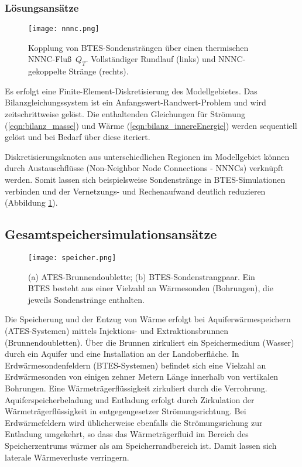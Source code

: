 \documentclass[12pt, a4paper, twoside, titlepage]{article}
\begin{document}
%

\subsubsection{L\" osungsans\" atze}
%

%
\begin{figure} [b!]
\centering
\texttt{[image: nnnc.png]}
\caption{Kopplung von BTES-Sondenstr\" angen \" uber einen thermischen NNNC-Flu\ss \ $Q_T$. Vollst\" andiger Rundlauf (links) und NNNC-gekoppelte Str\" ange (rechts).}
\label{fig:nnnc}
\end{figure}
%

%
\noindent
Es erfolgt eine Finite-Element-Diskretisierung des Modellgebietes. 
%
Das Bilanzgleichungssystem ist ein Anfangswert-Randwert-Problem und wird zeitschrittweise gel\" ost.
%
Die enthaltenden Gleichungen f\" ur Str\" omung (\ref{eqn:bilanz_masse}) und W\" arme (\ref{eqn:bilanz_innereEnergie}) werden sequentiell gel\" ost und bei Bedarf \" uber diese iteriert.

%
Diskretisierungsknoten aus unterschiedlichen Regionen im Modellgebiet k\" onnen durch Austauschfl\" usse (Non-Neighbor Node Connections - NNNCs) verkn\" upft werden.
%
Somit lassen sich beispielsweise Sondenstr\" ange in BTES-Simulationen verbinden
und der Vernetzungs- und Rechenaufwand deutlich reduzieren (Abbildung \ref{fig:nnnc}).
%
%


\subsection{Gesamtspeichersimulationsans\" atze}
%
\begin{figure} [b!]
\centering
\texttt{[image: speicher.png]}
\caption{(a) ATES-Brunnendoublette; (b) BTES-Sondenstrangpaar. Ein BTES besteht aus einer Vielzahl an W\" armesonden (Bohrungen), die jeweils Sondenstr\" ange enthalten.}
\label{fig:speicher}
\end{figure}
%


Die Speicherung und der Entzug von W\" arme erfolgt bei Aquiferw\"armespeichern (ATES-Systemen) mittels Injektions- und Extraktionsbrunnen (Brunnendoubletten).
%
\" Uber die Brunnen zirkuliert ein Speichermedium (Wasser) durch ein Aquifer und eine Installation an der Landoberfl\" ache.
%
In Erdw\" armesondenfeldern (BTES-Systemen) befindet sich eine Vielzahl an
Erdw\" armesonden von einigen zehner Metern L\" ange innerhalb von vertikalen Bohrungen.
%
Eine W\" armetr\" agerfl\" ussigkeit zirkuliert durch die Verrohrung.
%
Aquiferspeicherbeladung und Entladung erfolgt durch Zirkulation der W\" armetr\" agerfl\" ussigkeit in entgegengesetzer Str\" omungsrichtung.
%
Bei Erdw\" armefeldern wird \" ublicherweise ebenfalls die Str\" omungsrichung zur Entladung umgekehrt, so dass das W\" armetr\" agerfluid im Bereich des Speicherzentrums w\" armer als am Speicherrandbereich ist.
%
Damit lassen sich laterale W\" armeverluste verringern.
\end{document}
